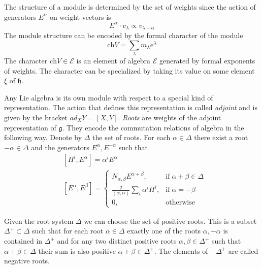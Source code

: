 \documentclass[preprint,12pt]{elsarticle}
\newcommand{\gf}{\mathfrak{g}}
\newcommand{\hf}{\mathfrak{h}}
\begin{document}
The structure of a module is determined by the set of weights since the action of generators $E^{\alpha}$ on weight vectors is
\begin{equation}
  \label{eq:5}
  E^{\alpha}\cdot v_{\lambda} \propto v_{\lambda+\alpha}
\end{equation}
The module structure can be encoded by the formal character of the module
\begin{equation}
  \label{eq:10}
  \mathrm{ch}V=\sum_{\lambda}m_{\lambda} e^{\lambda}
\end{equation}
The character  $\mathrm{ch}V\in \mathcal{E}$ is an element of algebra $\mathcal{E}$ generated by formal exponents of weights.
The character can be specialized by taking its value on some element $\xi$ of $\hf$.

Any Lie algebra is its own module with respect to a special kind of representation. The action that
defines this representation is called {\it adjoint} and is given by the bracket $ad_{X} Y=[X,Y]$. 
{\it Roots} are weights of the adjoint representation of $\gf$. They encode the commutation relations of algebra in the following way. Denote by $\Delta$ the set of roots. For each $\alpha\in \Delta$ there exist a root $-\alpha\in \Delta$ and the generators $E^{\alpha}, E^{-\alpha}$ such that
\begin{align}
  \label{eq:4}
  &  [H^{i},E^{\alpha}]=\alpha^{i}E^{\alpha} \\
  &\left[E^{\alpha},E^{\beta}\right]=
  \begin{cases}
    N_{\alpha,\beta} E^{\alpha+\beta}, & \mbox{if}\; \alpha+\beta\in \Delta\\
    \frac{2}{(\alpha,\alpha)} \sum_{i}\alpha^{i} H^{i},&  \mbox{if}\; \alpha=-\beta\\
    0,&\mbox{otherwise}
  \end{cases}
\end{align}

Given the root system $\Delta$ we can choose the set of positive roots. This is a subset  $\Delta^{+}\subset \Delta$ such that for each root $\alpha\in\Delta$ exactly one of the roots $\alpha, -\alpha$ is contained in $\Delta^{+}$ and for any two distinct positive roots $\alpha, \beta\in \Delta^{+}$ such that $\alpha+\beta\in \Delta$ their sum is also positive $\alpha+\beta\in\Delta^{+}$.
The elements of $-\Delta^{+}$ are called negative roots.
\end{document}
